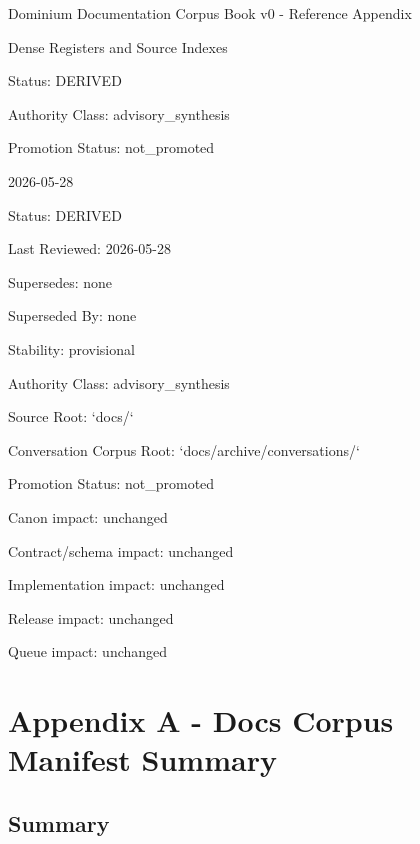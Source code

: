 \documentclass[11pt,a4paper]{report}
\begin{document}
\begin{titlepage}
\centering
\vspace*{2cm}
{\Huge Dominium Documentation Corpus Book v0 - Reference Appendix\par}
\vspace{1cm}
{\Large Dense Registers and Source Indexes\par}
\vspace{1.5cm}
{\large Status: DERIVED\par}
{\large Authority Class: advisory\_synthesis\par}
{\large Promotion Status: not\_promoted\par}
\vfill
{\large 2026-05-28\par}
\end{titlepage}
\tableofcontents
\clearpage
\raggedright
Status: DERIVED

Last Reviewed: 2026-\allowbreak{}05-\allowbreak{}28

Supersedes: none

Superseded By: none

Stability: provisional

Authority Class: advisory\_synthesis

Source Root: `docs/\allowbreak{}`

Conversation Corpus Root: `docs/\allowbreak{}archive/\allowbreak{}conversations/\allowbreak{}`

Promotion Status: not\_promoted

Canon impact: unchanged

Contract/\allowbreak{}schema impact: unchanged

Implementation impact: unchanged

Release impact: unchanged

Queue impact: unchanged


\chapter{Appendix A - Docs Corpus Manifest Summary}



\section{Summary}
\end{document}
